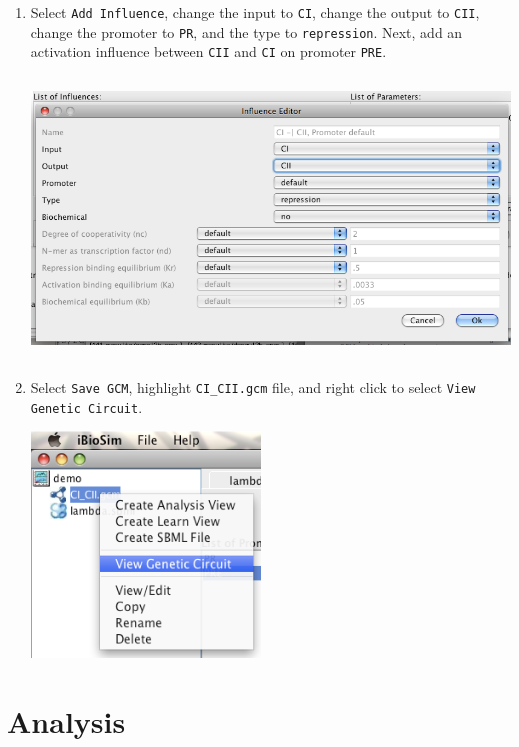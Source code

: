 \documentclass[titlepage,11pt]{article}
\begin{document}
\begin{enumerate}
\item Select {\tt Add Influence}, change the input to {\tt CI}, change
  the output to {\tt CII}, change the promoter to {\tt PR}, and the
  type to {\tt repression}.  Next, add an activation influence between
  {\tt CII} and {\tt CI} on promoter {\tt PRE}.

\includegraphics[height=75mm]{screenshots/influence}

\item Select {\tt Save GCM}, highlight {\tt CI\_CII.gcm} file, and
  right click to select {\tt View Genetic Circuit}.

\includegraphics[height=60mm]{screenshots/viewGenNet}
\end{enumerate}

\clearpage 

\section{Analysis}
\end{document}
